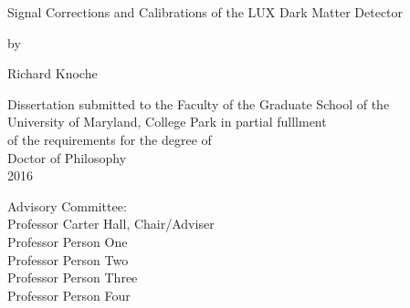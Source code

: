 \begin{titlepage}
    \begin{center}
        \vspace*{1cm}
        
        \LARGE
        Signal Corrections and Calibrations of the LUX Dark Matter Detector
        
        \vspace{1.5cm}
		by
		
		\vspace{0.5cm}        
        
        Richard Knoche
        
        \vfill
        
        \normalsize
        Dissertation submitted to the Faculty of the Graduate School of the \\
		University of Maryland, College Park in partial fulllment \\
		of the requirements for the degree of \\
		Doctor of Philosophy \\
		2016

    \end{center}

\vfill
\noindent    
Advisory Committee: \\
Professor Carter Hall, Chair/Adviser \\
Professor Person One \\
Professor Person Two \\
Professor Person Three \\
Professor Person Four \\
\clearpage

\end{titlepage}